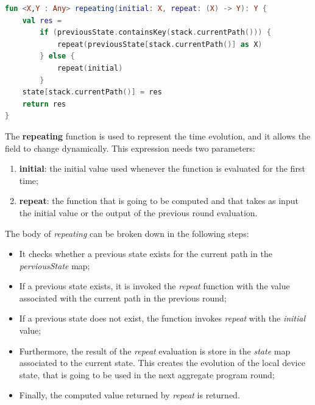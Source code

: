 \begin{lstlisting}[caption={Repeating implementation}, captionpos=b, language=Kotlin, label={code:repeating_implementation}]
fun <X,Y : Any> repeating(initial: X, repeat: (X) -> Y): Y {
    val res = 
        if (previousState.containsKey(stack.currentPath())) {
            repeat(previousState[stack.currentPath()] as X) 
        } else {
            repeat(initial)
        }
    state[stack.currentPath()] = res
    return res
}
\end{lstlisting}
The \textbf{repeating} function is used to represent the time evolution, and it allows the field to change dynamically.\newline
This expression needs two parameters:
\begin{enumerate}
    \item \textbf{initial}: the initial value used whenever the function is evaluated for the first time;
    \item \textbf{repeat}: the function that is going to be computed and that takes as input the initial value or the output of the previous round evaluation.
\end{enumerate}
The body of \textit{repeating} can be broken down in the following steps:
\begin{itemize}
    \item It checks whether a previous state exists for the current path in the \textit{perviousState} map;
    \item If a previous state exists, it is invoked the \textit{repeat} function with the value associated with the current path in the previous round;
    \item If a previous state does not exist, the function invokes \textit{repeat} with the \textit{initial} value;
    \item Furthermore, the result of the \textit{repeat} evaluation is store in the \textit{state} map associated to the current state. This creates the evolution of the local device state, that is going to be used in the next aggregate program round;
    \item Finally, the computed value returned by \textit{repeat} is returned.
\end{itemize}

